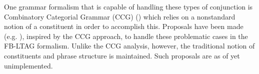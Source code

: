 One grammar formalism that is capable of handling these types of 
conjunction is Combinatory Categorial Grammar (CCG) (\cite{steedman90})
which relies on a nonstandard notion of a constituent in order to accomplish
this.  Proposals have been made (e.g. \cite{joshischabes91}),
inspired by the CCG approach, to handle these problematic cases in the
FB-LTAG formalism.  Unlike the CCG analysis, however, the traditional notion
of constituents and phrase structure is maintained.  Such proposals are
as of yet unimplemented.




